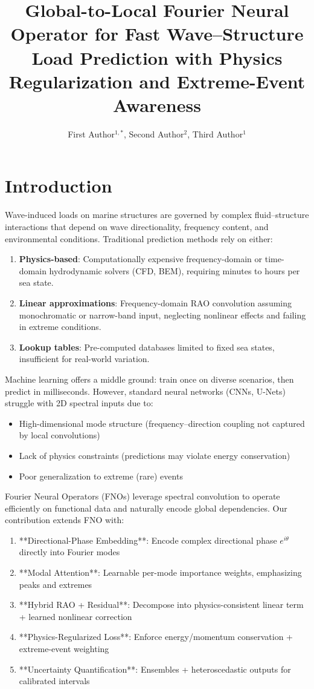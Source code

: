 \documentclass[journal,article,accept]{mdpi}
\title{Global-to-Local Fourier Neural Operator for Fast Wave--Structure Load Prediction with Physics Regularization and Extreme-Event Awareness}
\author{
  First Author$^{1,*}$,
  Second Author$^{2}$,
  Third Author$^{1}$
}
\affil{
  $^1$ Department of Engineering, University A, City, Country; emails@example.com\\
  $^2$ Institute of Marine Science, University B, City, Country; email@example.com
}
\begin{document}
\section{Introduction}
\label{sec:intro}

Wave-induced loads on marine structures are governed by complex fluid--structure interactions that depend on wave directionality, frequency content, and environmental conditions. Traditional prediction methods rely on either:
\begin{enumerate}
\item \textbf{Physics-based}: Computationally expensive frequency-domain or time-domain hydrodynamic solvers (CFD, BEM), requiring minutes to hours per sea state.
\item \textbf{Linear approximations}: Frequency-domain RAO convolution assuming monochromatic or narrow-band input, neglecting nonlinear effects and failing in extreme conditions.
\item \textbf{Lookup tables}: Pre-computed databases limited to fixed sea states, insufficient for real-world variation.
\end{enumerate}

Machine learning offers a middle ground: train once on diverse scenarios, then predict in milliseconds. However, standard neural networks (CNNs, U-Nets) struggle with 2D spectral inputs due to:
\begin{itemize}
\item High-dimensional mode structure (frequency--direction coupling not captured by local convolutions)
\item Lack of physics constraints (predictions may violate energy conservation)
\item Poor generalization to extreme (rare) events
\end{itemize}

Fourier Neural Operators (FNOs) leverage spectral convolution to operate efficiently on functional data and naturally encode global dependencies. Our contribution extends FNO with:
\begin{enumerate}
\item **Directional-Phase Embedding**: Encode complex directional phase $e^{i\theta}$ directly into Fourier modes
\item **Modal Attention**: Learnable per-mode importance weights, emphasizing peaks and extremes
\item **Hybrid RAO + Residual**: Decompose into physics-consistent linear term + learned nonlinear correction
\item **Physics-Regularized Loss**: Enforce energy/momentum conservation + extreme-event weighting
\item **Uncertainty Quantification**: Ensembles + heteroscedastic outputs for calibrated intervals
\end{enumerate}
\end{document}
